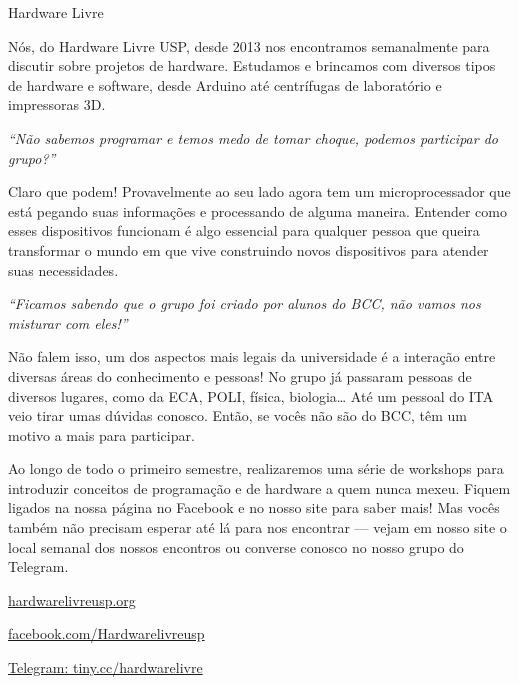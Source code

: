 \begin{subsecao}{Hardware Livre}


Nós, do Hardware Livre USP, desde 2013 nos encontramos semanalmente para
discutir sobre projetos de hardware. Estudamos e brincamos com diversos tipos de
hardware e software, desde Arduino até centrífugas de laboratório e impressoras
3D.

\textit{``Não sabemos programar e temos medo de tomar choque, podemos participar
do grupo?''}

Claro que podem! Provavelmente ao seu lado agora tem um microprocessador que
está pegando suas informações e processando de alguma maneira. Entender como
esses dispositivos funcionam é algo essencial para qualquer pessoa que queira
transformar o mundo em que vive construindo novos dispositivos para atender
suas necessidades.

\textit{``Ficamos sabendo que o grupo foi criado por alunos do BCC, não vamos
nos misturar com eles!''}

Não falem isso, um dos aspectos mais legais da universidade é a interação entre
diversas áreas do conhecimento e pessoas! No grupo já passaram pessoas de
diversos lugares, como da ECA, POLI, física, biologia… Até um pessoal do ITA
veio tirar umas dúvidas conosco. Então, se vocês não são do BCC, têm um motivo a
mais para participar.

Ao longo de todo o primeiro semestre, realizaremos uma série de workshops para
introduzir conceitos de programação e de hardware a quem nunca mexeu. Fiquem
ligados na nossa página no Facebook e no nosso site para saber mais! Mas vocês
também não precisam esperar até lá para nos encontrar — vejam em nosso site o
local semanal dos nossos encontros ou converse conosco no nosso grupo do
Telegram.

\begin{center}
  \Large
  \url{hardwarelivreusp.org}

  \url{facebook.com/Hardwarelivreusp}

  \url{Telegram: tiny.cc/hardwarelivre}
\end{center}

\end{subsecao}
